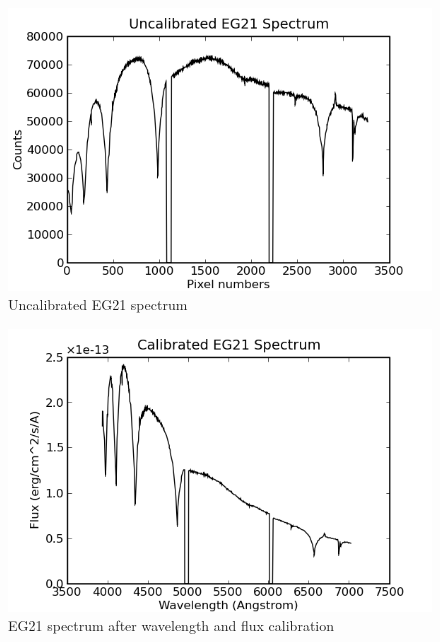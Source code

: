 \begin{figure}
\begin{center}
\includegraphics[width=0.9\columnwidth, bb=0 0 600 400]{images/uncalEG21.png}
\caption[Uncalibrated EG21 spectrum]{Uncalibrated EG21 spectrum}
\label{uncaleg21}
\end{center}
\end{figure}

\begin{figure}
\centering
\includegraphics[width=0.9\columnwidth, bb=0 0 600 400]{images/calEG21.png}
\caption[Calibrated EG21 spectrum]{EG21 spectrum after wavelength and flux calibration}
\label{caleg21}
\end{figure}

